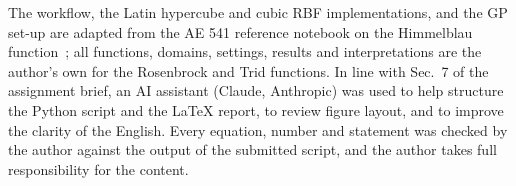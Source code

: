 The workflow, the Latin hypercube and cubic RBF implementations, and the GP set-up are adapted from the AE 541 reference notebook on the Himmelblau function~\cite{ae541tutorial}; all functions, domains, settings, results and interpretations are the author's own for the Rosenbrock and Trid functions. In line with Sec.~7 of the assignment brief, an AI assistant (Claude, Anthropic) was used to help structure the Python script and the \LaTeX{} report, to review figure layout, and to improve the clarity of the English. Every equation, number and statement was checked by the author against the output of the submitted script, and the author takes full responsibility for the content.
